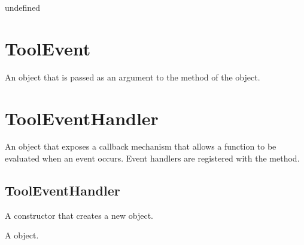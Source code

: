 \documentclass[letterpaper,12pt,english,openany,oneside]{sphinxmanual}
\begin{document}
\begin{sphinxVerbatim}[commandchars=\\\{\}]
\end{sphinxVerbatim}
\label{\detokenize{JS_3D_API:parameters-88}}

\label{\detokenize{JS_3D_API:section-124}}\label{\detokenize{JS_3D_API:returns-125}}

undefined


\section{ToolEvent}
\label{\detokenize{JS_3D_API:toolevent}}
An object that is passed as an argument to the  method of the  object.

\label{\detokenize{JS_3D_API:properties-33}}


\section{ToolEventHandler}
\label{\detokenize{JS_3D_API:tooleventhandler}}
An object that exposes a callback mechanism that allows a function to be evaluated when an event occurs. Event handlers are registered with the   method.


\subsection{ToolEventHandler}
\label{\detokenize{JS_3D_API:tooleventhandler-1}}\label{\detokenize{JS_3D_API:id42}}
A constructor that creates a new  object.

\label{\detokenize{JS_3D_API:syntax-125}}

\begin{sphinxVerbatim}[commandchars=\\\{\}]
 
\end{sphinxVerbatim}
\label{\detokenize{JS_3D_API:returns-126}}

A  object.
\end{document}
